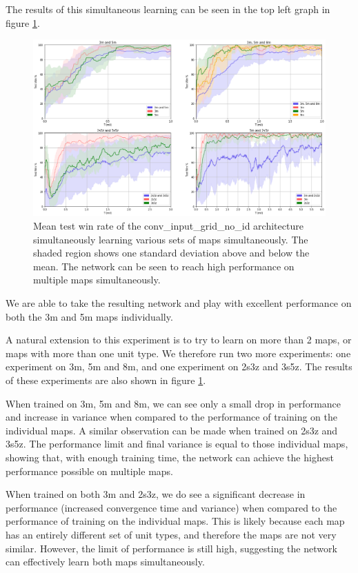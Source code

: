 The results of this simultaneous learning can be seen in the top left graph in figure \ref{fig:reptileall}. 




\begin{figure}[h]
    \centering
    \hbox{\hspace{-5em}\includegraphics[width=1.2\textwidth]{images/graphs/all.png}}
    \caption{Mean test win rate of the conv\_input\_grid\_no\_id architecture simultaneously learning various sets of maps simultaneously. The shaded region shows one standard deviation above and below the mean. The network can be seen to reach high performance on multiple maps simultaneously.}
    \label{fig:reptileall}
\end{figure}


We are able to take the resulting network and play with excellent performance on both the 3m and 5m maps individually. 

A natural extension to this experiment is to try to learn on more than 2 maps, or maps with more than one unit type. We therefore run two more experiments: one experiment on 3m, 5m and 8m, and one experiment on 2s3z and 3s5z. The results of these experiments are also shown in figure \ref{fig:reptileall}.



When trained on 3m, 5m and 8m, we can see only a small drop in performance and increase in variance when compared to the performance of training on the individual maps. A similar observation can be made when trained on 2s3z and 3s5z. The performance limit and final variance is equal to those individual maps, showing that, with enough training time, the network can achieve the highest performance possible on multiple maps.

When trained on both 3m and 2s3z, we do see a significant decrease in performance (increased convergence time and variance) when compared to the performance of training on the individual maps. This is likely because each map has an entirely different set of unit types, and therefore the maps are not very similar. However, the limit of performance is still high, suggesting the network can effectively learn both maps simultaneously.

